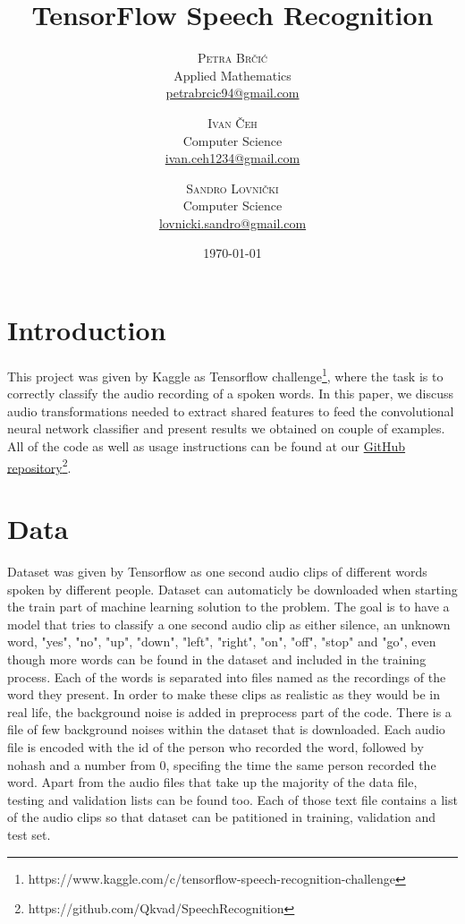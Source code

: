 \documentclass[twoside]{article}
\title{TensorFlow Speech Recognition} %
\author{%
\textsc{Petra Br\v{c}i\'c}\\%
\normalsize Applied Mathematics \\
\normalsize \href{mailto:petrabrcic94@gmail.com}{petrabrcic94@gmail.com} 
\and
\textsc{Ivan \v{C}eh}\\%
\normalsize Computer Science \\
\normalsize \href{mailto:ivan.ceh1234@gmail.com}{ivan.ceh1234@gmail.com} 
\and
\textsc{Sandro Lovni\v{c}ki}\\%
\normalsize Computer Science \\ 
\normalsize \href{mailto:lovnicki.sandro@gmail.com}{lovnicki.sandro@gmail.com}
}
\date{\today}
\begin{document}
\maketitle

\begin{multicols}{2}

\section{Introduction}
This project was given by Kaggle as Tensorflow challenge\footnote{https://www.kaggle.com/c/tensorflow-speech-recognition-challenge}, where the task is to correctly classify the audio recording of a spoken words. In this paper, we discuss audio transformations needed to extract shared features to feed the convolutional neural network classifier and present results we obtained on couple of examples. All of the code as well as usage instructions can be found at our \hyperref[https://github.com/Qkvad/SpeechRecognition]{GitHub repository}\footnote{https://github.com/Qkvad/SpeechRecognition}.

\section{Data}
Dataset was given by Tensorflow as one second audio clips of different words spoken by different people. Dataset can automaticly be downloaded when starting the train part of machine learning solution to the problem. 
The goal is to have a model that tries to classify a one second audio clip as either silence, an unknown word, "yes", "no", "up", "down", "left", "right", "on", "off", "stop" and "go", even though more words can be found in the dataset and included in the training process. Each of the words is separated into files named as the recordings of the word they present. In order to make these clips as realistic as they would be in real life, the background noise is added in preprocess part of the code. There is a file of few background noises within the dataset that is downloaded. 
Each audio file is encoded with the id of the person who recorded the word, followed by nohash and a number from 0, specifing the time the same person recorded the word.  
Apart from the audio files that take up the majority of the data file, testing and validation lists can be found too. Each of those text file contains a list of the audio clips so that dataset can be patitioned in training, validation and test set. 

\end{multicols}
\end{document}
